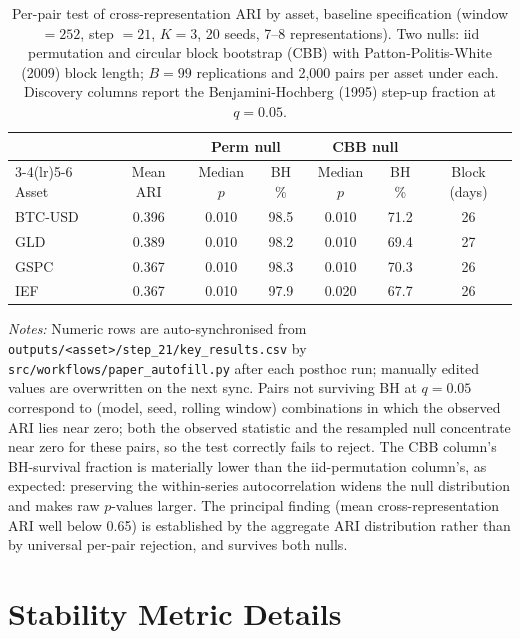 \documentclass[preprint,12pt,authoryear]{elsarticle}
\begin{document}
\begin{table}[!htbp]
\centering
\small
\setlength{\tabcolsep}{4pt}
\caption{Per-pair test of cross-representation ARI by asset, baseline specification (window $=252$, step $=21$, $K=3$, 20 seeds, 7--8 representations). Two nulls: iid permutation and \citet{PolitisRomano1992CBB} circular block bootstrap (CBB) with Patton-Politis-White (2009) block length; $B=99$ replications and 2{,}000 pairs per asset under each. Discovery columns report the Benjamini-Hochberg (1995) step-up fraction at $q=0.05$.}
\label{tab:perm_per_asset}
\begin{tabular}{lcccccc}
\toprule
 & & \multicolumn{2}{c}{Perm null} & \multicolumn{2}{c}{CBB null} & \\
\cmidrule(lr){3-4}\cmidrule(lr){5-6}
Asset & Mean ARI & Median $p$ & BH \% & Median $p$ & BH \% & Block (days) \\
\midrule
BTC-USD & 0.396 & 0.010 & 98.5 & 0.010 & 71.2 & 26 \\
GLD & 0.389 & 0.010 & 98.2 & 0.010 & 69.4 & 27 \\
GSPC & 0.367 & 0.010 & 98.3 & 0.010 & 70.3 & 26 \\
IEF & 0.367 & 0.010 & 97.9 & 0.020 & 67.7 & 26 \\
\bottomrule
\end{tabular}
\medskip
\footnotesize
\parbox{\linewidth}{\textit{Notes:} Numeric rows are auto-synchronised from \texttt{outputs/<asset>/step\_21/key\_results.csv} by \texttt{src/workflows/paper\_autofill.py} after each posthoc run; manually edited values are overwritten on the next sync. Pairs not surviving BH at $q=0.05$ correspond to (model, seed, rolling window) combinations in which the observed ARI lies near zero; both the observed statistic and the resampled null concentrate near zero for these pairs, so the test correctly fails to reject. The CBB column's BH-survival fraction is materially lower than the iid-permutation column's, as expected: preserving the within-series autocorrelation widens the null distribution and makes raw $p$-values larger. The principal finding (mean cross-representation ARI well below 0.65) is established by the aggregate ARI distribution rather than by universal per-pair rejection, and survives both nulls.}
\end{table}

\section{Stability Metric Details}
\label{app:metrics}
\end{document}
